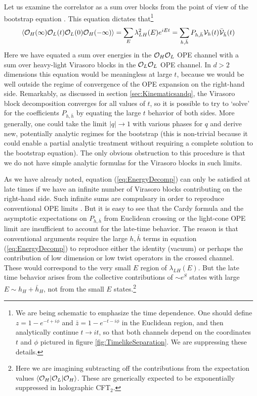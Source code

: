 \documentclass[12pt]{article}
\numberwithin{equation}{section}
\def\>{\rangle}
\def\<{\langle}
\newcommand{\be}{\begin{eqnarray}}
\newcommand{\ee}{\end{eqnarray}}
\newcommand{\CO}{{\cal O}}
\newcommand{\CV}{{\cal V}}
\begin{document}
Let us examine the correlator as a sum over blocks from the point of view of the bootstrap equation \cite{FerraraOriginalBootstrap1, PolyakovOriginalBootstrap2, Rattazzi:2008pe}.  This equation dictates that\footnote{We are being schematic to emphasize the time dependence.  One should define $z = 1 - e^{-t + i \phi}$ and $\bar z = 1 - e^{-t - i \phi}$ in the Euclidean region, and then analytically continue $t \to it$, so that both channels depend on the coordinates $t$ and $\phi$ pictured in figure \ref{fig:TimelikeSeparation}.  We are suppressing these details.}
\be \label{eq:EnergyDecomp}
\< \CO_H(\infty) \CO_L(t) \CO_L(0) \CO_H(-\infty) \> = \sum_E   \lambda^2_{LH}(E) e^{i E t}
= \sum_{h, \bar h} P_{h, \bar h} \CV_h(t) \bar \CV_{\bar h}(t)
\ee
Here we have equated a sum over energies in the $\CO_H \CO_L$ OPE channel with a sum over heavy-light Virasoro blocks in the $\CO_L \CO_L$ OPE channel.  In $d > 2$ dimensions this equation would be meaningless at large $t$, because we would be well outside the regime of convergence of the OPE expansion on the right-hand side.  Remarkably, as discussed in section \ref{sec:Kinematicsandq}, the Virasoro block decomposition converges for all values of $t$, so it is possible to try to `solve' for the coefficients $P_{h, \bar h}$ by equating the large $t$ behavior of both sides.  More generally, one could take the limit $|q| \to 1$ with various phases for $q$ and derive new, potentially analytic regimes for the bootstrap (this is non-trivial because it could enable a partial analytic treatment without requiring a complete solution to the bootstrap equation).  The only obvious obstruction to this procedure is that we do not have simple analytic formulas for the Virasoro blocks in such limits.  

As we have already noted, equation (\ref{eq:EnergyDecomp}) can only be satisfied at late times if we have an infinite number of Virasoro blocks contributing on the right-hand side.  Such infinite sums are compulsary in order to reproduce conventional OPE limits \cite{Cardy:1986ie, Pappadopulo:2012jk, Fitzpatrick:2012yx, KomargodskiZhiboedov}.  But it is easy to see that the Cardy formula and the asymptotic expectations on $P_{h, \bar h}$ from Euclidean crossing or the light-cone OPE limit are insufficient to account for the late-time behavior.  The reason is that conventional arguments require the large $h, \bar h$ terms in equation (\ref{eq:EnergyDecomp}) to reproduce either the identity (vacuum) or perhaps the contribution of low dimension or low twist operators in the crossed channel. These would correspond to the very small $E$ region of $\lambda_{LH}(E)$.  But the late time behavior arises from the collective contributions of $\sim e^S$ states with large $E \sim h_H + \bar h_H$, not from the small $E$ states.\footnote{Here we are imagining subtracting off the contributions from the expectation values $\<\CO_H | \CO_L | \CO_H \>$. These are generically expected to be exponentially suppressed \cite{Kraus:2016nwo}  in holographic CFT$_2$.}
\end{document}
